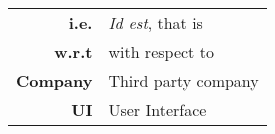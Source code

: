 \begin{center}
    \begin{tabular}{r|l}
        \textbf{i.e.} & \textit{Id est}, that is  \\
        \textbf{w.r.t} & with respect to  \\
        \textbf{Company} & Third party company \\
        \textbf{UI} & User Interface \\

    \end{tabular}
\end{center}